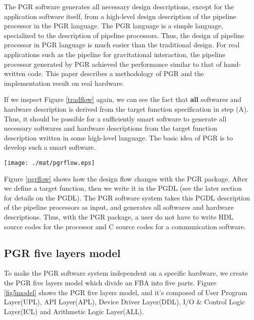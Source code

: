 \documentclass{llncs}
\begin{document}
The PGR software generates all necessary design descriptions, except for
the application software itself, from a high-level design description
of the pipeline processor in the PGR language. The PGR language is a
simple language, specialized to the description of pipeline
processors. Thus, the design of pipeline processor in PGR language is
much easier than the traditional design. For real applications such as
the pipeline for gravitational interaction, the pipeline processor
generated by PGR achieved the performance similar to that of
hand-written code. 
This paper describes a methodology of PGR and the implementation result on real hardware.

If we inspect Figure \ref{tradflow} again, we can see the fact that
{\bfseries all} softwares and hardware description is derived from the
target function specification in step (A). Thus, it should be possible
for a sufficiently smart software to generate all necessary softwares
and hardware descriptions from the target function description written
in some high-level language. The basic idea of PGR is to develop such
a smart software.

\begin{figure*}[htb]
\begin{center}
\texttt{[image: ./mat/pgrflow.eps]}
\caption{How the design flow changes with PGR.}
\label{pgrflow}
\end{center}
\end{figure*}

Figure \ref{pgrflow} shows how the design flow changes with the PGR package.
After we define a target function, then we write it in the PGDL
(see the later section for details on the PGDL).
The PGR software system takes this PGDL description of the pipeline processors
as input, and generates all softwares and hardware descriptions.
Thus, with the PGR package, a user do not have to write HDL source codes for
the processor and C source codes for a communication software.

\subsection{PGR five layers model}
To make the PGR software system independent on a specific hardware,
we create the PGR five layers model which divide 
an FBA into five parts.
Figure \ref{fig5model} shows the PGR five layers model, 
and it's composed of User Program Layer(UPL), API Layer(APL),
Device Driver Layer(DDL), I/O \& Control Logic Layer(ICL) and
Arithmetic Logic Layer(ALL).
\end{document}
